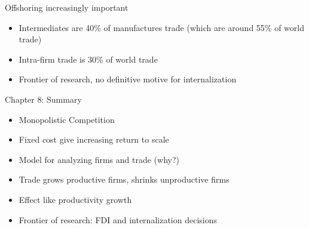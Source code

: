 \documentclass{beamer}
\begin{document}
\begin{frame}{Offshoring increasingly important}

    \begin{itemize}
        \item Intermediates are 40\% of manufactures trade (which are around 55\% of world trade)
        \item Intra-firm trade is 30\% of world trade
        \item Frontier of research, no definitive motive for internalization
    \end{itemize}

\end{frame}

\begin{frame}{Chapter 8: Summary}

    \begin{itemize}
        \item Monopolistic Competition
        \item Fixed cost give increasing return to scale
        \item Model for analyzing firms and trade (why?)
        \item Trade grows productive firms, shrinks unproductive firms
        \item Effect like productivity growth
        \item Frontier of research: FDI and internalization decisions
    \end{itemize}

\end{frame}


\end{document}
